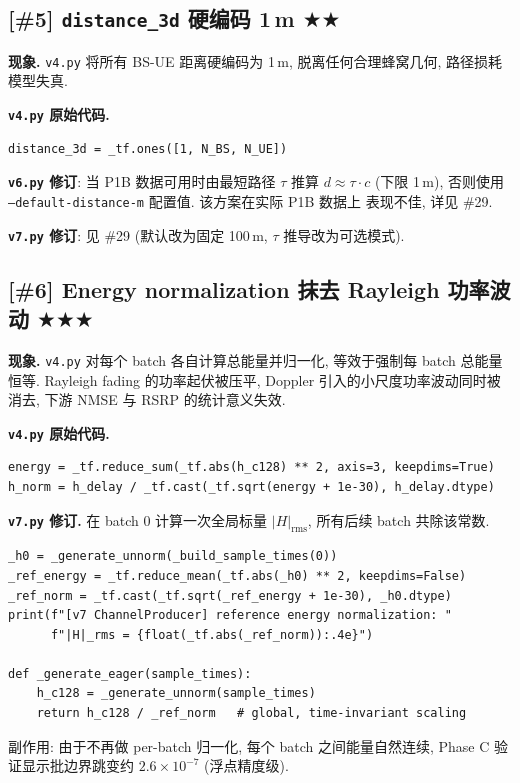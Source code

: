 \documentclass[11pt,a4paper,UTF8,fontset=fandol]{ctexart}
\newcommand{\stwo}{\textcolor{starcolor}{$\bigstar\bigstar$}}
\newcommand{\sthree}{\textcolor{starcolor}{$\bigstar\bigstar\bigstar$}}
\newcommand{\vfour}{\texttt{v4.py}}
\newcommand{\vsix}{\texttt{v6.py}}
\newcommand{\vseven}{\texttt{v7.py}}
\newcommand{\bugitem}[3]{%
  \subsection{[\##1] #2 \hfill #3}%
  \vspace{-0.5em}%
}
\begin{document}
\bugitem{5}{\texttt{distance\_3d} 硬编码 1\,m}{\stwo}

\textbf{现象.} \vfour{} 将所有 BS-UE 距离硬编码为 1\,m,
脱离任何合理蜂窝几何, 路径损耗模型失真.

\textbf{\vfour{} 原始代码.}
\begin{lstlisting}[caption={v4.py: line 1782}]
distance_3d = _tf.ones([1, N_BS, N_UE])
\end{lstlisting}

\textbf{\vsix{} 修订}: 当 P1B 数据可用时由最短路径 $\tau$ 推算 $d \approx \tau \cdot c$
(下限 1\,m), 否则使用 \texttt{--default-distance-m} 配置值. 该方案在实际 P1B 数据上
表现不佳, 详见 \#29.

\textbf{\vseven{} 修订}: 见 \#29 (默认改为固定 100\,m, $\tau$ 推导改为可选模式).

\bugitem{6}{Energy normalization 抹去 Rayleigh 功率波动}{\sthree}

\textbf{现象.} \vfour{} 对每个 batch 各自计算总能量并归一化,
等效于强制每 batch 总能量恒等. Rayleigh fading 的功率起伏被压平,
Doppler 引入的小尺度功率波动同时被消去, 下游 NMSE 与 RSRP 的统计意义失效.

\textbf{\vfour{} 原始代码.}
\begin{lstlisting}[caption={v4.py: lines 1834--1835}]
energy = _tf.reduce_sum(_tf.abs(h_c128) ** 2, axis=3, keepdims=True)
h_norm = h_delay / _tf.cast(_tf.sqrt(energy + 1e-30), h_delay.dtype)
\end{lstlisting}

\textbf{\vseven{} 修订.} 在 batch 0 计算一次全局标量 $|H|_{\text{rms}}$,
所有后续 batch 共除该常数.
\begin{lstlisting}[caption={v7.py: lines 2117--2125}]
_h0 = _generate_unnorm(_build_sample_times(0))
_ref_energy = _tf.reduce_mean(_tf.abs(_h0) ** 2, keepdims=False)
_ref_norm = _tf.cast(_tf.sqrt(_ref_energy + 1e-30), _h0.dtype)
print(f"[v7 ChannelProducer] reference energy normalization: "
      f"|H|_rms = {float(_tf.abs(_ref_norm)):.4e}")

def _generate_eager(sample_times):
    h_c128 = _generate_unnorm(sample_times)
    return h_c128 / _ref_norm   # global, time-invariant scaling
\end{lstlisting}

副作用: 由于不再做 per-batch 归一化, 每个 batch 之间能量自然连续,
Phase C 验证显示批边界跳变约 $2.6\times 10^{-7}$ (浮点精度级).
\end{document}
